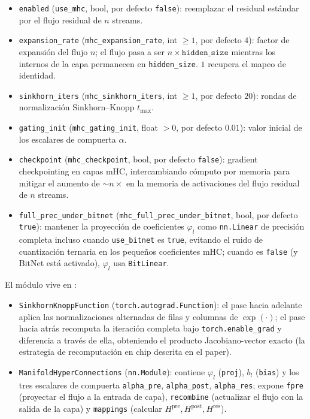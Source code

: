 \begin{itemize}[leftmargin=*]
    \item \texttt{enabled} (\texttt{use\_mhc}, bool, por defecto
        \texttt{false}): reemplazar el residual estándar por el flujo residual
        de $n$ streams.
    \item \texttt{expansion\_rate} (\texttt{mhc\_expansion\_rate}, int $\ge 1$,
        por defecto $4$): factor de expansión del flujo $n$; el flujo pasa a
        ser $n \times \texttt{hidden\_size}$ mientras los internos de la capa
        permanecen en \texttt{hidden\_size}. $1$ recupera el mapeo de
        identidad.
    \item \texttt{sinkhorn\_iters} (\texttt{mhc\_sinkhorn\_iters}, int $\ge 1$,
        por defecto $20$): rondas de normalización Sinkhorn--Knopp $t_{\max}$.
    \item \texttt{gating\_init} (\texttt{mhc\_gating\_init}, float $> 0$,
        por defecto $0.01$): valor inicial de los escalares de compuerta
        $\alpha$.
    \item \texttt{checkpoint} (\texttt{mhc\_checkpoint}, bool, por defecto
        \texttt{false}): gradient checkpointing en capas mHC, intercambiando
        cómputo por memoria para mitigar el aumento de $\sim n{\times}$ en la
        memoria de activaciones del flujo residual de $n$ streams.
    \item \texttt{full\_prec\_under\_bitnet}
        (\texttt{mhc\_full\_prec\_under\_bitnet}, bool, por defecto
        \texttt{true}): mantener la proyección de coeficientes $\varphi_l$ como
        \texttt{nn.Linear} de precisión completa incluso cuando
        \texttt{use\_bitnet} es \texttt{true}, evitando el ruido de
        cuantización ternaria en los pequeños coeficientes mHC; cuando es
        \texttt{false} (y BitNet está activado), $\varphi_l$ usa
        \texttt{BitLinear}.
\end{itemize}

El módulo vive en :
\begin{itemize}[leftmargin=*]
    \item \texttt{Sinkhorn\-Knopp\-Function} (\texttt{torch.autograd.Function}):
        el pase hacia adelante aplica las normalizaciones alternadas de filas y
        columnas de $\exp(\cdot)$; el pase hacia atrás recomputa la iteración
        completa bajo \texttt{torch.enable\_grad} y diferencia a través de
        ella, obteniendo el producto Jacobiano-vector exacto (la estrategia de
        recomputación en chip descrita en el paper).
    \item \texttt{ManifoldHyperConnections} (\texttt{nn.Module}): contiene
        $\varphi_l$ (\texttt{proj}), $b_l$ (\texttt{bias}) y los tres escalares
        de compuerta \texttt{alpha\_pre}, \texttt{alpha\_post},
        \texttt{alpha\_res}; expone \texttt{fpre} (proyectar el flujo a la
        entrada de capa), \texttt{recombine} (actualizar el flujo con la salida
        de la capa) y \texttt{mappings} (calcular $H^{\text{pre}},
        H^{\text{post}}, H^{\text{res}}$).
\end{itemize}

